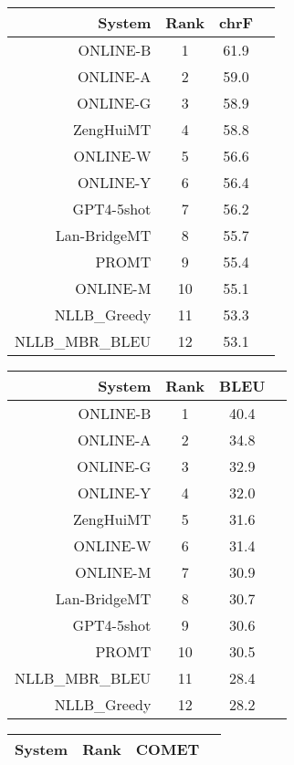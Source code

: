 \documentclass[11pt]{article}
\begin{document}
\begin{table}  
\scriptsize\begin{subtable}[t]{0.33\textwidth}
\begin{tabular}{rccc}
\toprule 
System & Rank & chrF \\ 
\midrule 
ONLINE-B & 1 & 61.9 \\ 
ONLINE-A & 2 & 59.0 \\ 
ONLINE-G & 3 & 58.9 \\ 
ZengHuiMT & 4 & 58.8 \\ 
ONLINE-W & 5 & 56.6 \\ 
ONLINE-Y & 6 & 56.4 \\ 
GPT4-5shot & 7 & 56.2 \\ 
Lan-BridgeMT & 8 & 55.7 \\ 
PROMT & 9 & 55.4 \\ 
ONLINE-M & 10 & 55.1 \\ 
NLLB\_Greedy & 11 & 53.3 \\ 
NLLB\_MBR\_BLEU & 12 & 53.1 \\ 
\bottomrule 
\end{tabular} 
\end{subtable} 
\begin{subtable}[t]{0.33\textwidth}
\begin{tabular}{rccc}
\toprule 
System & Rank & BLEU \\ 
\midrule 
ONLINE-B & 1 & 40.4 \\ 
ONLINE-A & 2 & 34.8 \\ 
ONLINE-G & 3 & 32.9 \\ 
ONLINE-Y & 4 & 32.0 \\ 
ZengHuiMT & 5 & 31.6 \\ 
ONLINE-W & 6 & 31.4 \\ 
ONLINE-M & 7 & 30.9 \\ 
Lan-BridgeMT & 8 & 30.7 \\ 
GPT4-5shot & 9 & 30.6 \\ 
PROMT & 10 & 30.5 \\ 
NLLB\_MBR\_BLEU & 11 & 28.4 \\ 
NLLB\_Greedy & 12 & 28.2 \\ 
\bottomrule 
\end{tabular} 
\end{subtable} 
\begin{subtable}[t]{0.33\textwidth}
\begin{tabular}{rccc}
\toprule 
System & Rank & COMET \\ 
\midrule 

\end{tabular}
\end{subtable}
\end{table}
\end{document}
